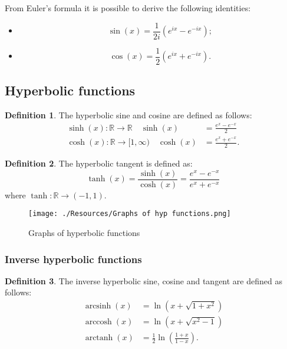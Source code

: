 \documentclass[12pt, a4paper]{article}
\newcommand{\bb}[1]{\mathbb{#1}}
\newcommand{\f}[2]{\frac{#1}{#2}}
\DeclareMathOperator{\arccosh}{arccosh}
\DeclareMathOperator{\arcsinh}{arcsinh}
\DeclareMathOperator{\arctanh}{arctanh}
\theoremstyle{definition}
\newtheorem{definition}{Definition}[section]
\theoremstyle{plain}
\begin{document}
From Euler's formula it is possible to derive the following identities: \begin{itemize}

	\item $$\sin(x)=\f{1}{2i}\left(e^{ix}-e^{-ix}\right);$$
	\item $$\cos(x)=\f{1}{2}\left(e^{ix}+e^{-ix}\right).$$

\end{itemize}	

\subsection{Hyperbolic functions}

\begin{definition}
The hyperbolic sine and cosine are defined as follows: $$\begin{aligned}
\sinh(x):\bb{R}\to\bb{R} \quad \sinh(x)&=\f{e^{x}-e^{-x}}{2}\\
\cosh(x):\bb{R}\to [1,\infty) \quad \cosh(x)&=\f{e^{x}+e^{-x}}{2}.
\end{aligned}$$
\end{definition}

\begin{definition}
The hyperbolic tangent is defined as: $$\tanh(x)=\f{\sinh(x)}{\cosh(x)}=\f{e^{x}-e^{-x}}{e^{x}+e^{-x}}$$ where $\tanh: \bb{R}\to(-1,1).$
\end{definition}

\begin{figure}[H]
\centering
\texttt{[image: ./Resources/Graphs of hyp functions.png]}
\caption{Graphs of hyperbolic functions}
\label{fig:hyperbolic graphs}
\end{figure}

\subsubsection{Inverse hyperbolic functions}

\begin{definition}
The inverse hyperbolic sine, cosine and tangent are defined as follows:
$$\begin{aligned}
\arcsinh(x)&=\ln(x+\sqrt{1+x^2}) \\
\arccosh(x)&=\ln(x+\sqrt{x^2-1}) \\
\arctanh(x)&=\f{1}{2}\ln(\f{1+x}{1-x}).
\end{aligned}$$
\end{definition}
\end{document}
